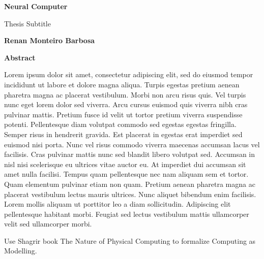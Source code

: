 \documentclass{amsart}
\begin{document}


\thispagestyle{plain}
\begin{center}
    \Large
    \textbf{Neural Computer}
        
    \vspace{0.4cm}
    \large
    Thesis Subtitle
        
    \vspace{0.4cm}
    \textbf{Renan Monteiro Barbosa}
       
    \vspace{0.9cm}
    \textbf{Abstract}
    
    Lorem ipsum dolor sit amet, consectetur adipiscing elit, sed do eiusmod tempor incididunt ut labore et dolore magna aliqua. 
    Turpis egestas pretium aenean pharetra magna ac placerat vestibulum. 
    Morbi non arcu risus quis. Vel turpis nunc eget lorem dolor sed viverra. 
    Arcu cursus euismod quis viverra nibh cras pulvinar mattis. 
    Pretium fusce id velit ut tortor pretium viverra suspendisse potenti. 
    Pellentesque diam volutpat commodo sed egestas egestas fringilla. 
    Semper risus in hendrerit gravida. 
    Est placerat in egestas erat imperdiet sed euismod nisi porta. 
    Nunc vel risus commodo viverra maecenas accumsan lacus vel facilisis. 
    Cras pulvinar mattis nunc sed blandit libero volutpat sed. 
    Accumsan in nisl nisi scelerisque eu ultrices vitae auctor eu. 
    At imperdiet dui accumsan sit amet nulla facilisi. 
    Tempus quam pellentesque nec nam aliquam sem et tortor. 
    Quam elementum pulvinar etiam non quam. 
    Pretium aenean pharetra magna ac placerat vestibulum lectus mauris ultrices. 
    Nunc aliquet bibendum enim facilisis. 
    Lorem mollis aliquam ut porttitor leo a diam sollicitudin. 
    Adipiscing elit pellentesque habitant morbi. 
    Feugiat sed lectus vestibulum mattis ullamcorper velit sed ullamcorper morbi.
\end{center}

\clearpage

Use Shagrir book The Nature of Physical Computing to formalize Computing as Modelling.
\end{document}
